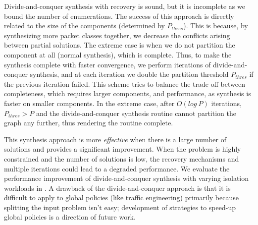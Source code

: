 Divide-and-conquer synthesis with recovery is sound, but 
it is incomplete as we bound the
number of enumerations. The success of this approach
is directly related to the size of the components (determined by $P_{thres}$). 
This is because, by synthesizing more packet classes together, we decrease the
conflicts arising between partial solutions. The extreme case is when we do not 
partition the component at all (normal synthesis), which is complete. 
Thus, to make the synthesis complete with faster convergence, we
perform iterations of divide-and-conquer synthesis, and at each iteration we double the
partition threshold $P_{thres}$ if the previous iteration failed. 
This scheme tries to balance the trade-off between completeness, which
requires larger components, and performance, as synthesis is faster on smaller
components. 
In the extreme case, after $O(log~P)$
iterations, $P_{thres} > P$ and the divide-and-conquer synthesis routine cannot partition the graph any further,
thus rendering the routine complete. 
 
 This synthesis approach is more \emph{effective}
 when there is a large number of solutions and provides a
 significant improvement. When the problem is highly 
 constrained and the number of solutions is low, 
 the recovery mechanisms and multiple iterations could 
 lead to a degraded performance. 
 We evaluate the performance improvement of divide-and-conquer
 synthesis with varying isolation workloads in .
A drawback of the divide-and-conquer approach is that it is 
 difficult to apply to global policies (like traffic engineering) primarily because
 splitting the input problem isn't easy; development
 of strategies to speed-up global policies is a direction of future work.

 
%
